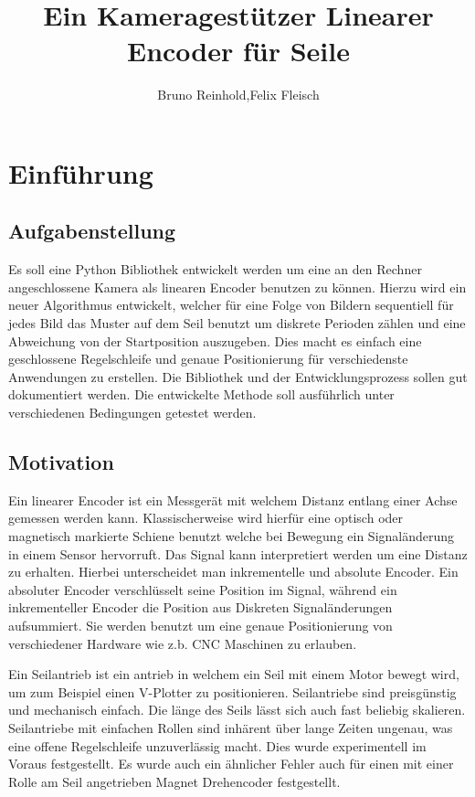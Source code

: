 \documentclass[10pt,a4paper]{scrreport}
\begin{document}
	
	\title{Ein Kameragestützer Linearer Encoder für Seile}
	\author{Bruno Reinhold,Felix Fleisch}
	\maketitle

\section{Einführung}

\subsection{Aufgabenstellung}
Es soll eine Python Bibliothek entwickelt werden um eine an den Rechner angeschlossene Kamera als linearen Encoder benutzen zu können. Hierzu wird ein neuer Algorithmus entwickelt, welcher für eine Folge von Bildern sequentiell für jedes Bild das Muster auf dem Seil benutzt um diskrete Perioden zählen und eine Abweichung von der Startposition auszugeben.
Dies macht es einfach eine geschlossene Regelschleife und genaue Positionierung für verschiedenste Anwendungen zu erstellen.
Die Bibliothek und der Entwicklungsprozess sollen gut dokumentiert werden.
Die entwickelte Methode soll ausführlich unter verschiedenen Bedingungen getestet werden.


\subsection{Motivation}
Ein linearer Encoder ist ein Messgerät mit welchem Distanz entlang einer Achse gemessen werden kann. Klassischerweise wird hierfür eine optisch oder magnetisch markierte Schiene benutzt welche bei Bewegung ein Signaländerung in einem Sensor hervorruft. Das Signal kann interpretiert werden um eine Distanz zu erhalten. Hierbei unterscheidet man inkrementelle und absolute Encoder. Ein absoluter Encoder verschlüsselt seine Position im Signal, während ein inkrementeller Encoder die Position aus Diskreten Signaländerungen aufsummiert. Sie werden benutzt um eine genaue Positionierung von verschiedener Hardware wie z.b. CNC Maschinen zu erlauben. 

Ein Seilantrieb ist ein antrieb in welchem ein Seil mit einem Motor bewegt wird, um zum Beispiel einen V-Plotter zu positionieren. Seilantriebe sind preisgünstig und mechanisch einfach. Die länge des Seils lässt sich auch fast beliebig skalieren. Seilantriebe mit einfachen Rollen sind inhärent über lange Zeiten ungenau, was eine offene Regelschleife unzuverlässig macht. Dies wurde experimentell im Voraus festgestellt. Es wurde auch ein ähnlicher Fehler auch für einen mit einer Rolle am Seil angetrieben Magnet Drehencoder festgestellt.
\end{document}
